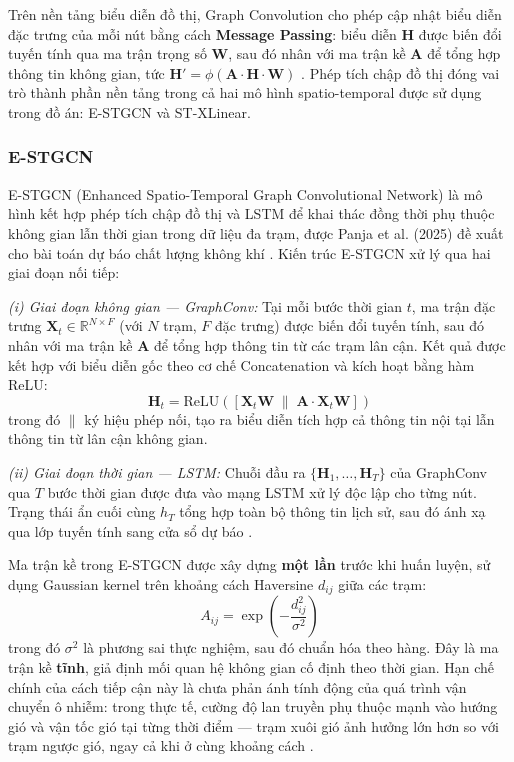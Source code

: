 Trên nền tảng biểu diễn đồ thị, Graph Convolution cho phép cập nhật biểu diễn đặc trưng của mỗi nút bằng cách \textbf{Message Passing}: biểu diễn $\mathbf{H}$ được biến đổi tuyến tính qua ma trận trọng số $\mathbf{W}$, sau đó nhân với ma trận kề $\mathbf{A}$ để tổng hợp thông tin không gian, tức $\mathbf{H}' = \phi(\mathbf{A} \cdot \mathbf{H} \cdot \mathbf{W})$ \cite{panja2025estgcn}. Phép tích chập đồ thị đóng vai trò thành phần nền tảng trong cả hai mô hình spatio-temporal được sử dụng trong đồ án: E-STGCN và ST-XLinear.

\subsubsection{E-STGCN}

E-STGCN (Enhanced Spatio-Temporal Graph Convolutional Network) là mô hình kết hợp phép tích chập đồ thị và LSTM để khai thác đồng thời phụ thuộc không gian lẫn thời gian trong dữ liệu đa trạm, được Panja et al. (2025) đề xuất cho bài toán dự báo chất lượng không khí \cite{panja2025estgcn}. Kiến trúc E-STGCN xử lý qua hai giai đoạn nối tiếp:

\textit{(i) Giai đoạn không gian --- GraphConv:} Tại mỗi bước thời gian $t$, ma trận đặc trưng $\mathbf{X}_t \in \mathbb{R}^{N \times F}$ (với $N$ trạm, $F$ đặc trưng) được biến đổi tuyến tính, sau đó nhân với ma trận kề $\mathbf{A}$ để tổng hợp thông tin từ các trạm lân cận. Kết quả được kết hợp với biểu diễn gốc theo cơ chế Concatenation và kích hoạt bằng hàm ReLU:
\begin{equation}
    \mathbf{H}_t = \text{ReLU}\left(\left[\mathbf{X}_t\mathbf{W} \;\|\; \mathbf{A} \cdot \mathbf{X}_t\mathbf{W}\right]\right)
\end{equation}
trong đó $\|$ ký hiệu phép nối, tạo ra biểu diễn tích hợp cả thông tin nội tại lẫn thông tin từ lân cận không gian.

\textit{(ii) Giai đoạn thời gian --- LSTM:} Chuỗi đầu ra $\{\mathbf{H}_1, \ldots, \mathbf{H}_T\}$ của GraphConv qua $T$ bước thời gian được đưa vào mạng LSTM xử lý độc lập cho từng nút. Trạng thái ẩn cuối cùng $h_T$ tổng hợp toàn bộ thông tin lịch sử, sau đó ánh xạ qua lớp tuyến tính sang cửa sổ dự báo \cite{panja2025estgcn}.

Ma trận kề trong E-STGCN được xây dựng \textbf{một lần} trước khi huấn luyện, sử dụng Gaussian kernel trên khoảng cách Haversine $d_{ij}$ giữa các trạm:
\begin{equation}
    A_{ij} = \exp\left(-\frac{d_{ij}^2}{\sigma^2}\right)
\end{equation}
trong đó $\sigma^2$ là phương sai thực nghiệm, sau đó chuẩn hóa theo hàng. Đây là ma trận kề \textbf{tĩnh}, giả định mối quan hệ không gian cố định theo thời gian. Hạn chế chính của cách tiếp cận này là chưa phản ánh tính động của quá trình vận chuyển ô nhiễm: trong thực tế, cường độ lan truyền phụ thuộc mạnh vào hướng gió và vận tốc gió tại từng thời điểm — trạm xuôi gió ảnh hưởng lớn hơn so với trạm ngược gió, ngay cả khi ở cùng khoảng cách \cite{panja2025estgcn}.

